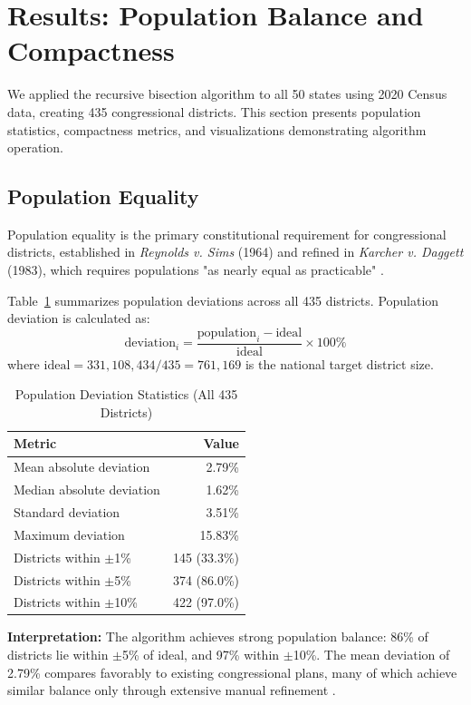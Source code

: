 \section{Results: Population Balance and Compactness}
\label{sec:results}

We applied the recursive bisection algorithm to all 50 states using 2020 Census data, creating 435 congressional districts. This section presents population statistics, compactness metrics, and visualizations demonstrating algorithm operation.

\subsection{Population Equality}

Population equality is the primary constitutional requirement for congressional districts, established in \textit{Reynolds v. Sims} (1964) and refined in \textit{Karcher v. Daggett} (1983), which requires populations "as nearly equal as practicable" \cite{reynolds1964,karcher1983}.

Table~\ref{tab:population_stats} summarizes population deviations across all 435 districts. Population deviation is calculated as:
\[
\text{deviation}_i = \frac{\text{population}_i - \text{ideal}}{\text{ideal}} \times 100\%
\]
where $\text{ideal} = 331,\!108\!,434 / 435 = 761\!,169$ is the national target district size.

\begin{table}[h]
\centering
\caption{Population Deviation Statistics (All 435 Districts)}
\label{tab:population_stats}
\begin{tabular}{lr}
\toprule
\textbf{Metric} & \textbf{Value} \\
\midrule
Mean absolute deviation & 2.79\% \\
Median absolute deviation & 1.62\% \\
Standard deviation & 3.51\% \\
Maximum deviation & 15.83\% \\
\midrule
Districts within $\pm$1\% & 145 (33.3\%) \\
Districts within $\pm$5\% & 374 (86.0\%) \\
Districts within $\pm$10\% & 422 (97.0\%) \\
\bottomrule
\end{tabular}
\end{table}

\textbf{Interpretation:} The algorithm achieves strong population balance: 86\% of districts lie within $\pm$5\% of ideal, and 97\% within $\pm$10\%. The mean deviation of 2.79\% compares favorably to existing congressional plans, many of which achieve similar balance only through extensive manual refinement \cite{chen2013unintentional}.

